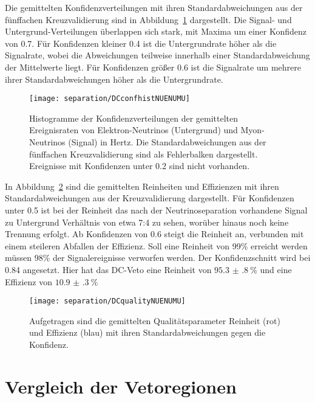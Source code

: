 Die gemittelten Konfidenzverteilungen mit ihren Standardabweichungen aus der fünffachen Kreuzvalidierung sind in Abbildung~\ref{fig:confidencenuevsnumu} dargestellt.
Die Signal- und Untergrund-Verteilungen überlappen sich stark, mit Maxima um einer Konfidenz von 0.7.
Für Konfidenzen kleiner 0.4 ist die Untergrundrate höher als die Signalrate, wobei die Abweichungen teilweise innerhalb einer Standardabweichung der Mittelwerte liegt.
Für Konfidenzen größer 0.6 ist die Signalrate um mehrere ihrer Standardabweichungen höher als die Untergrundrate.
\begin{figure}
\begin{center}
    \texttt{[image: separation/DCconfhistNUENUMU]}
\end{center}
\vspace{-2em}
\caption{Histogramme der Konfidenzverteilungen der gemittelten Ereignisraten von Elektron-Neutrinos (Untergrund) und Myon-Neutrinos (Signal) in Hertz. Die Standardabweichungen aus der fünffachen Kreuzvalidierung sind als Fehlerbalken dargestellt. Ereignisse mit Konfidenzen unter 0.2 sind nicht vorhanden.}
\label{fig:confidencenuevsnumu}
\end{figure}

In Abbildung~\ref{fig:qualitynuevsnumu} sind die gemittelten Reinheiten und Effizienzen mit ihren Standardabweichungen aus der Kreuzvalidierung dargestellt.
Für Konfidenzen unter 0.5 ist bei der Reinheit das nach der Neutrinoseparation vorhandene Signal zu Untergrund Verhältnis von etwa 7:4 zu sehen, worüber hinaus noch keine Trennung erfolgt.
Ab Konfidenzen von 0.6 steigt die Reinheit an, verbunden mit einem steileren Abfallen der Effizienz.
Soll eine Reinheit von 99\% erreicht werden müssen 98\% der Signalereignisse verworfen werden.
Der Konfidenzschnitt wird bei 0.84 angesetzt. 
Hier hat das DC-Veto eine Reinheit von $\SI{95.3(8)}{\%}$ und eine Effizienz von $\SI{10.9(3)}{\%}$ 
\begin{figure}
\begin{center}
    \texttt{[image: separation/DCqualityNUENUMU]}
\end{center}
\vspace{-2em}
\caption{Aufgetragen sind die gemittelten Qualitätsparameter Reinheit (rot) und Effizienz (blau) mit ihren Standardabweichungen gegen die Konfidenz.}
\label{fig:qualitynuevsnumu}
\end{figure}



\section{Vergleich der Vetoregionen}
\label{vergleich}

